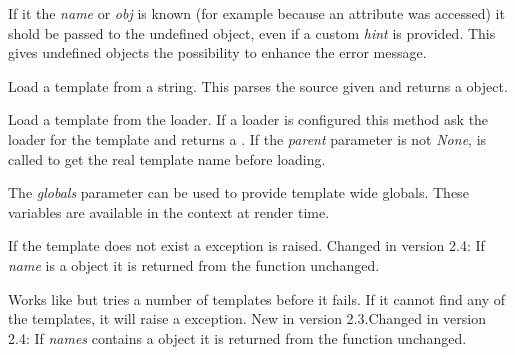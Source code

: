 \documentclass[a4paper,10pt,english]{sphinxmanual}
\begin{document}
\begin{fulllineitems}
\begin{fulllineitems}
If it the \emph{name} or \emph{obj} is known (for example because an attribute
was accessed) it shold be passed to the undefined object, even if
a custom \emph{hint} is provided.  This gives undefined objects the
possibility to enhance the error message.

\end{fulllineitems}


\begin{fulllineitems}
\label{api:jinja2.Environment.from_string}
Load a template from a string.  This parses the source given and
returns a {\hyperref[api:jinja2.Template]{}} object.

\end{fulllineitems}


\begin{fulllineitems}
\label{api:jinja2.Environment.get_template}
Load a template from the loader.  If a loader is configured this
method ask the loader for the template and returns a {\hyperref[api:jinja2.Template]{}}.
If the \emph{parent} parameter is not \emph{None}, {\hyperref[api:jinja2.Environment.join_path]{}} is called
to get the real template name before loading.

The \emph{globals} parameter can be used to provide template wide globals.
These variables are available in the context at render time.

If the template does not exist a {\hyperref[api:jinja2.TemplateNotFound]{}} exception is
raised.
Changed in version 2.4: If \emph{name} is a {\hyperref[api:jinja2.Template]{}} object it is returned from the
function unchanged.
\end{fulllineitems}


\begin{fulllineitems}
\label{api:jinja2.Environment.select_template}
Works like {\hyperref[api:jinja2.Environment.get_template]{}} but tries a number of templates
before it fails.  If it cannot find any of the templates, it will
raise a {\hyperref[api:jinja2.TemplatesNotFound]{}} exception.
New in version 2.3.Changed in version 2.4: If \emph{names} contains a {\hyperref[api:jinja2.Template]{}} object it is returned
from the function unchanged.
\end{fulllineitems}


\end{fulllineitems}
\end{document}
